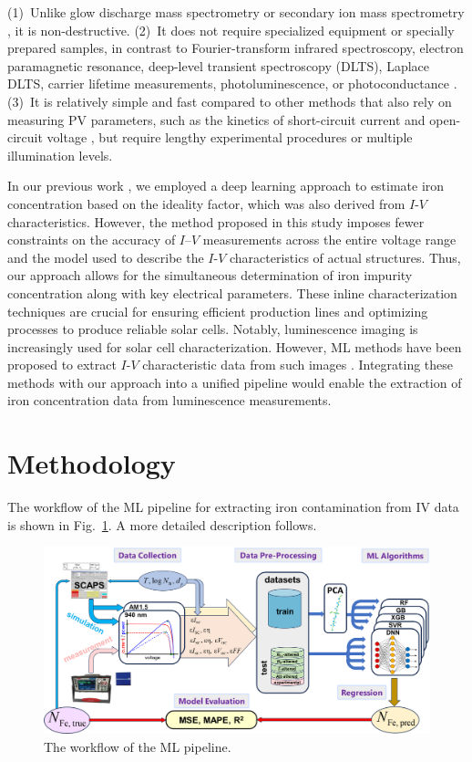 \documentclass[a4paper,fleqn]{cas-sc}
\begin{document}
\noindent
(1)~Unlike glow discharge mass spectrometry or secondary ion mass spectrometry \cite{DiSabatino2014}, it is non-destructive.
\noindent
(2)~It does not require specialized equipment or specially prepared samples, in contrast
to Fourier-transform infrared spectroscopy, electron paramagnetic resonance, deep-level transient spectroscopy (DLTS),
Laplace DLTS, carrier lifetime measurements, photoluminescence, or photoconductance
\cite{Schroder2006, HowMuchPhysics, LaplDLTS, Rein2, Schmidt2005, FeMethod2012, Goodarzi2017}.
\noindent
(3)~It is relatively simple and fast compared to other methods that also rely on measuring PV parameters,
such as the kinetics of short-circuit current \cite{Olikh2021JAP} and open-circuit voltage \cite{Herguth2022},
but require lengthy experimental procedures or multiple illumination levels.

In our previous work \cite{Olikh2022PPV},
we employed a deep learning approach to estimate iron concentration based on the ideality factor,
which was also derived from $I$-$V$ characteristics.
However, the method proposed in this study imposes fewer constraints on the accuracy of $I$–$V$ measurements across the entire voltage range
and the model used to describe the $I$-$V$ characteristics of actual structures.
Thus, our approach allows for the simultaneous determination of iron impurity concentration along with key electrical parameters.
These inline characterization techniques are crucial for ensuring efficient production lines and optimizing processes to produce reliable solar cells.
Notably, luminescence imaging is increasingly used for solar cell characterization.
However, ML methods have been proposed to extract $I$-$V$ characteristic data from such images \cite{Kunze2023, Battaglia2023}.
Integrating these methods with our approach into a unified pipeline would enable the extraction of iron concentration data from luminescence measurements.

\section{Methodology}
The workflow of the ML pipeline for extracting iron contamination from IV data is shown in Fig.~\ref{fig1}.
 A more detailed description follows.

\begin{figure}
	\centering
		\includegraphics[width=0.9\linewidth]{Fig1.png}
	  \caption{The workflow of the ML pipeline.}\label{fig1}
\end{figure} 
 
\end{document}
